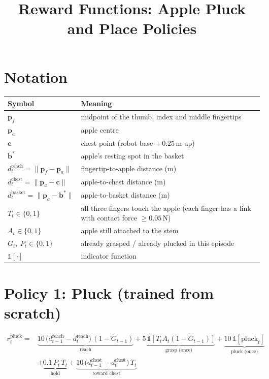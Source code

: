 \documentclass[11pt]{article}
\title{Reward Functions: Apple Pluck and Place Policies}
\date{}
\newcommand{\ind}{\mathbb{1}}
\begin{document}
\maketitle

\section*{Notation}

\begin{tabular}{@{}ll@{}}
\toprule
Symbol & Meaning \\
\midrule
$\mathbf{p}_f$ & midpoint of the thumb, index and middle fingertips \\
$\mathbf{p}_a$ & apple centre \\
$\mathbf{c}$ & chest point (robot base $+\,0.25$\,m up) \\
$\mathbf{b}^{*}$ & apple's resting spot in the basket \\
$d^{\mathrm{reach}}_t = \lVert \mathbf{p}_f - \mathbf{p}_a \rVert$ & fingertip-to-apple distance (m) \\
$d^{\mathrm{chest}}_t = \lVert \mathbf{p}_a - \mathbf{c} \rVert$ & apple-to-chest distance (m) \\
$d^{\mathrm{basket}}_t = \lVert \mathbf{p}_a - \mathbf{b}^{*} \rVert$ & apple-to-basket distance (m) \\
$T_t \in \{0,1\}$ & all three fingers touch the apple (each finger has a link with contact force $\ge 0.05$\,N) \\
$A_t \in \{0,1\}$ & apple still attached to the stem \\
$G_t,\ P_t \in \{0,1\}$ & already grasped / already plucked in this episode \\
$\ind[\cdot]$ & indicator function \\
\bottomrule
\end{tabular}

\section*{Policy 1: Pluck (trained from scratch)}

\begin{equation}
\begin{aligned}
r_t^{\mathrm{pluck}} ={}&
\underbrace{10\,\big(d^{\mathrm{reach}}_{t-1}-d^{\mathrm{reach}}_{t}\big)\,(1-G_{t-1})}_{\text{reach}}
+\underbrace{5\,\ind\!\left[T_t A_t (1-G_{t-1})\right]}_{\text{grasp (once)}}
+\underbrace{10\,\ind\!\left[\mathrm{pluck}_t\right]}_{\text{pluck (once)}} \\
&+\underbrace{0.1\,P_t\,T_t}_{\text{hold}}
+\underbrace{10\,\big(d^{\mathrm{chest}}_{t-1}-d^{\mathrm{chest}}_{t}\big)\,T_t}_{\text{toward chest}}
\end{aligned}
\end{equation}
\end{document}
